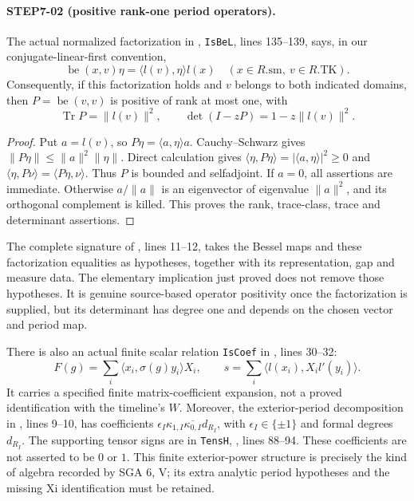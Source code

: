 \documentclass[11pt,a4paper]{article}
\newcommand{\Tr}{\operatorname{Tr}}
\begin{document}
\paragraph{STEP7-02 (positive rank-one period operators).}
The actual normalized factorization in
,
\texttt{IsBeL}, lines 135--139, says, in our conjugate-linear-first convention,
\[
 \operatorname{be}(x,v)\eta=\langle l(v),\eta\rangle l(x)
 \quad(x\in R.\mathrm{sm},\ v\in R.\mathrm{TK}).
\]
Consequently, if this factorization holds and $v$ belongs to both indicated domains, then $P=\operatorname{be}(v,v)$ is positive of rank at most one, with
\[
 \Tr P=\|l(v)\|^2,\qquad \det(I-zP)=1-z\|l(v)\|^2.
\]
\begin{proof}
Put $a=l(v)$, so $P\eta=\langle a,\eta\rangle a$. Cauchy--Schwarz gives $\|P\eta\|\le\|a\|^2\|\eta\|$. Direct calculation gives $\langle\eta,P\eta\rangle=|\langle a,\eta\rangle|^2\ge0$ and $\langle\eta,P\nu\rangle=\langle P\eta,\nu\rangle$. Thus $P$ is bounded and selfadjoint. If $a=0$, all assertions are immediate. Otherwise $a/\|a\|$ is an eigenvector of eigenvalue $\|a\|^2$, and its orthogonal complement is killed. This proves the rank, trace-class, trace and determinant assertions.
\end{proof}
The complete signature of
, lines 11--12, takes the Bessel maps and these factorization equalities as hypotheses, together with its representation, gap and measure data. The elementary implication just proved does not remove those hypotheses. It is genuine source-based operator positivity once the factorization is supplied, but its determinant has degree one and depends on the chosen vector and period map.

There is also an actual finite scalar relation \texttt{IsCoef} in
, lines 30--32:
\[
 F(g)=\sum_i\langle x_i,\sigma(g)y_i\rangle X_i,
 \qquad s=\sum_i\langle l(x_i),X_i l'(y_i)\rangle.
\]
It carries a specified finite matrix-coefficient expansion, not a proved identification with the timeline's $W$. Moreover, the exterior-period decomposition in
, lines 9--10, has coefficients
$\epsilon_I\kappa_{1,I}\overline{\kappa_{0,I}}d_{R_I}$, with $\epsilon_I\in\{\pm1\}$ and formal degrees $d_{R_I}$. The supporting tensor signs are in \texttt{TensH}, , lines 88--94. These coefficients are not asserted to be $0$ or $1$. This finite exterior-power structure is precisely the kind of algebra recorded by SGA 6, V; its extra analytic period hypotheses and the missing Xi identification must be retained.
\end{document}
